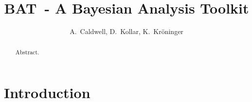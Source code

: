 \documentclass[11pt, a4paper]{article}
\newcommand{\BAT}{{\sc BAT}}
\begin{document}

\thispagestyle{empty} 

\begin{figure}
\end{figure} 

\title{\BAT\ - A {\sc Bayesian Analysis Toolkit}} 

\author{A.~Caldwell, D.~Kollar, K.~Kr\"oninger} 

\maketitle

\begin{abstract} 
Abstract. 
\end{abstract} 

\pagebreak 


\tableofcontents

\pagebreak 


\section{Introduction}
\end{document}
